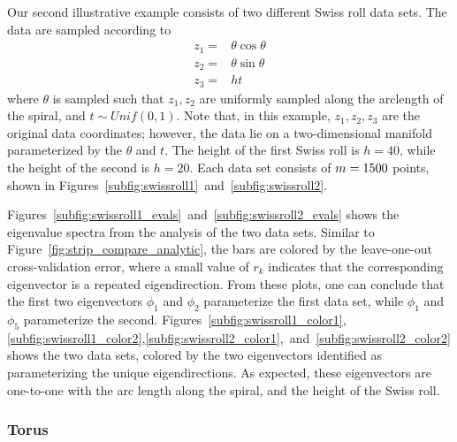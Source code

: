 Our second illustrative example consists of two different Swiss roll data sets.
%
The data are sampled according to
\begin{equation}
\begin{aligned}
z_1 =& \theta \cos \theta \\
z_2 =& \theta \sin \theta \\
z_3 =& h t
\end{aligned}
\end{equation}
%
where $\theta$ is sampled such that $z_1, z_2$ are uniformly sampled along the arclength of the spiral, and $t \sim Unif(0,1)$.
%
Note that, in this example, $z_1, z_2, z_3$ are the original data coordinates; however, the data lie on a two-dimensional manifold parameterized by the $\theta$ and $t$.
%
The height of the first Swiss roll is $h = 40$, while the height of the second is $h = 20$.
%
Each data set consists of $m=1500$ points, shown in Figures~\ref{subfig:swissroll1}~and~\ref{subfig:swissroll2}.
%

Figures~\ref{subfig:swissroll1_evals}~and~\ref{subfig:swissroll2_evals} shows the eigenvalue spectra from the analysis of the two data sets.
%
Similar to Figure~\ref{fig:strip_compare_analytic}, the bars are colored by the leave-one-out cross-validation error, where a small value of $r_k$ indicates that the corresponding eigenvector is a repeated eigendirection.
%
From these plots, one can conclude that the first two eigenvectors $\phi_1$ and $\phi_2$ parameterize the first data set, while $\phi_1$ and $\phi_5$ parameterize the second.
%
Figures~\ref{subfig:swissroll1_color1},\ref{subfig:swissroll1_color2},\ref{subfig:swissroll2_color1},~and~\ref{subfig:swissroll2_color2} shows the two data sets, colored by the two eigenvectors identified as parameterizing the unique eigendirections.
%
As expected, these eigenvectors are one-to-one with the arc length along the spiral, and the height of the Swiss roll.

\subsubsection{Torus}

